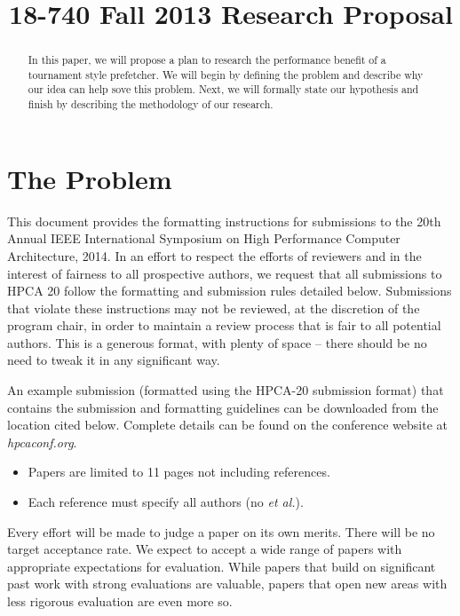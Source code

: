 \documentclass[pageno]{jpaper}
\begin{document}
\title{
18-740 Fall 2013 Research Proposal}

\date{}
\maketitle

\thispagestyle{empty}

\begin{abstract}
In this paper, we will propose a plan to research the performance benefit of 
a tournament style prefetcher. We will begin by defining the problem
and describe why our idea can help sove this problem.  Next, we will formally
state our hypothesis and finish by describing the methodology of our research.
\end{abstract}

\section{The Problem}

This document provides the formatting instructions for submissions to the 20th
Annual IEEE International Symposium on High Performance Computer Architecture,
2014. In an effort to respect the efforts of reviewers and in
the interest of fairness to all prospective authors, we request that all
submissions to HPCA 20 follow the formatting and submission rules detailed
below.  Submissions that violate these instructions may not be
reviewed, at the discretion of the program chair, in order to maintain a review
process that is fair to all potential authors.  This is a generous format,
with plenty of space -- there should be no need to tweak it in any
significant way.

An example submission (formatted using the HPCA-20 submission format) that
contains the submission and formatting guidelines can be downloaded from
the location cited below.  Complete details can be found on the
conference website at {\em hpcaconf.org}.


\begin{itemize}
\item Papers are limited to 11 pages not including references.
\item Each reference must specify all authors (no {\it et al.}).
\end{itemize}


Every effort will be made to judge a paper on its own merits. There will be no target acceptance rate. We expect to accept a wide range of papers with appropriate expectations for evaluation. 
While papers that build on significant past work with strong evaluations are valuable, papers that open new areas with less rigorous evaluation are even more so.
\end{document}
